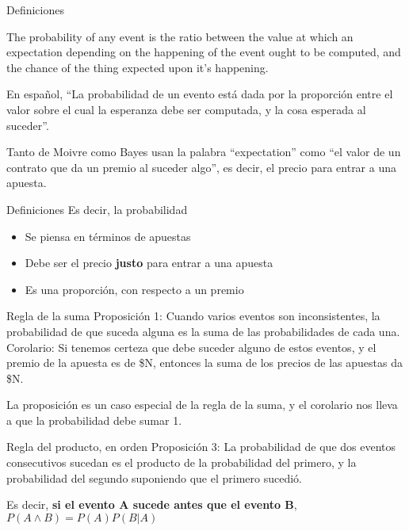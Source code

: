 \documentclass{beamer}
\begin{document}
\begin{frame}{Definiciones}
	\begin{displayquote}
		The probability of any event is the ratio between the value at which an expectation depending on the happening of the event ought to be computed, and the chance of the thing expected upon it’s happening.  
	\end{displayquote}

	En español, ``La probabilidad de un evento está dada por la proporción entre el valor sobre el cual la esperanza debe ser computada, y la cosa esperada al suceder''.

	Tanto de Moivre como Bayes usan la palabra ``expectation'' como ``el valor de un contrato que da un premio al suceder algo'', es decir, el precio para entrar a una apuesta.
\end{frame}

\begin{frame}{Definiciones}
	Es decir, la probabilidad
	\begin{itemize}
		\item Se piensa en términos de apuestas
		\item Debe ser el precio \textbf{justo} para entrar a una apuesta
		\item Es una proporción, con respecto a un premio
	\end{itemize}
\end{frame}

\begin{frame}{Regla de la suma}
	Proposición 1: Cuando varios eventos son inconsistentes, la probabilidad de que suceda alguna es la suma de las probabilidades de cada una.
	Corolario: Si tenemos certeza que debe suceder alguno de estos eventos, y el premio de la apuesta es de \$N, entonces la suma de los precios de las apuestas da \$N.

	La proposición es un caso especial de la regla de la suma, y el corolario nos lleva a que la probabilidad debe sumar 1.
\end{frame}

\begin{frame}{Regla del producto, en orden}
	Proposición 3: La probabilidad de que dos eventos consecutivos sucedan es el producto de la probabilidad del primero, y la probabilidad del segundo suponiendo que el primero sucedió.

	Es decir, \textbf{si el evento A sucede antes que el evento B}, $P(A \land B) = P(A) P(B|A)$
\end{frame}
\end{document}
